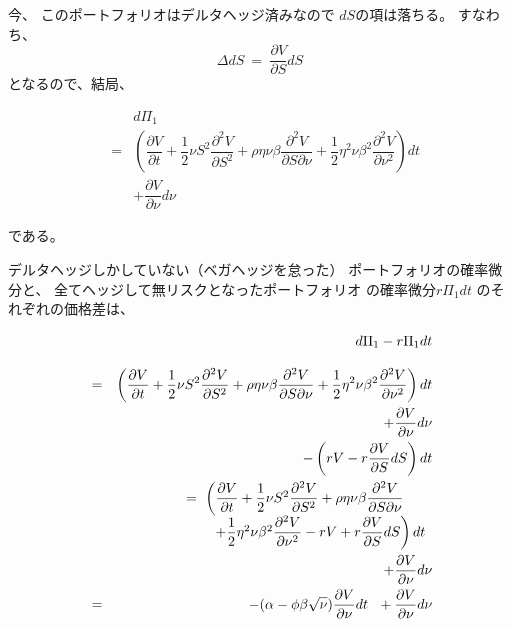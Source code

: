 \documentclass[uplatex,a4j,12pt,dvipdfmx]{jsarticle}
\begin{document}
今、
このポートフォリオはデルタヘッジ済みなので
$dS$の項は落ちる。
すなわち、
$$
	\Delta dS
	\ = \
	\dfrac{\partial V}{\partial S} dS
$$
となるので、結局、


\begin{eqnarray*}
	&&
	d\Pi_{1}
	\\[3mm] &=&
	\left(
	\dfrac{\partial V}{\partial t}
	+
	\dfrac{1}{2}
	\nu S^{2}
	\dfrac{\partial^{2} V}{\partial S^{2}}
	+
	\rho \eta \nu \beta
	\dfrac{\partial^{2} V}{\partial S \partial \nu}
	+
	\dfrac{1}{2}
	\eta^{2} \nu \beta^{2}
	\dfrac{\partial^{2} V}{\partial \nu^{2}}
	\right)dt
	\\ &&
	+
	\dfrac{\partial V}{\partial \nu} d \nu
\end{eqnarray*}


である。

デルタヘッジしかしていない（ベガヘッジを怠った）
ポートフォリオの確率微分と、
全てヘッジして無リスクとなったポートフォリオ
の確率微分$r \Pi_{1} dt$
のそれぞれの価格差は、


\begin{eqnarray*}
	&&
	d\Pi_{1} - r \Pi_{1} dt
	\\[3mm] &=&
	\left(
	\dfrac{\partial V}{\partial t}
	+
	\dfrac{1}{2}
	\nu S^{2}
	\dfrac{\partial^{2} V}{\partial S^{2}}
	+
	\rho \eta \nu \beta
	\dfrac{\partial^{2} V}{\partial S \partial \nu}
	+
	\dfrac{1}{2}
	\eta^{2} \nu \beta^{2}
	\dfrac{\partial^{2} V}{\partial \nu^{2}}
	\right)dt
	\\ &&
	+
	\dfrac{\partial V}{\partial \nu} d \nu
	\\ && -
	\left(
	rV
	-
	r
	\dfrac{\partial V}{\partial S} dS
	\right)
	dt
	\\ &&
	\begin{array}{l}
		\hspace{-7mm}
		= \
		\left(
		\dfrac{\partial V}{\partial t}
		+
		\dfrac{1}{2}
		\nu S^{2}
		\dfrac{\partial^{2} V}{\partial S^{2}}
		+
		\rho \eta \nu \beta
		\dfrac{\partial^{2} V}{\partial S \partial \nu}
		\right.
		\\
		\left.
		+
		\dfrac{1}{2}
		\eta^{2} \nu \beta^{2}
		\dfrac{\partial^{2} V}{\partial \nu^{2}}
		-
		rV
		+
		r
		\dfrac{\partial V}{\partial S} dS
		\right)dt
	\end{array}
	\\ &&
	+
	\dfrac{\partial V}{\partial \nu} d \nu
	\\ &=&
	-
	( \alpha - \phi \beta \sqrt{\nu} )
	\dfrac{\partial V}{\partial \nu}
	dt
	\ \
	+
	\dfrac{\partial V}{\partial \nu} d \nu
\end{eqnarray*}
\end{document}
